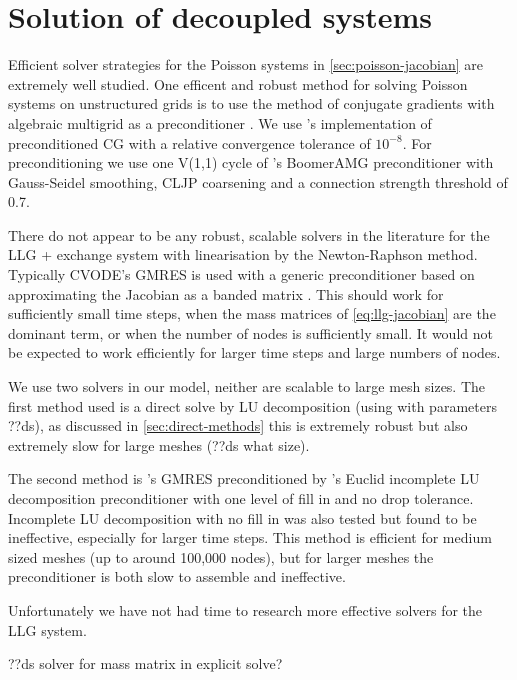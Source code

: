 \section{Solution of decoupled systems}
\label{sec:llg-only-system}

Efficient solver strategies for the Poisson systems in \cref{sec:poisson-jacobian} are extremely well studied.
One efficent and robust method for solving Poisson systems on unstructured grids is to use the method of conjugate gradients with algebraic multigrid as a preconditioner \cite[Chap. 2]{HowardElmanDavidSilvester2006}.
We use \oomph's implementation of preconditioned CG with a relative convergence tolerance of $10^{-8}$.
For preconditioning we use one V(1,1) cycle of \hypre's BoomerAMG preconditioner \cite{hypre} with Gauss-Seidel smoothing, CLJP coarsening and a connection strength threshold of 0.7.


There do not appear to be any robust, scalable solvers in the literature for the LLG + exchange system with linearisation by the Newton-Raphson method.
Typically CVODE's GMRES is used with a generic preconditioner based on approximating the Jacobian as a banded matrix \cite{nmag} \cite{Vasslios}.
This should work for sufficiently small time steps, \ie when the mass matrices of \cref{eq:llg-jacobian} are the dominant term, or when the number of nodes is sufficiently small.
It would not be expected to work efficiently for larger time steps and large numbers of nodes.

We use two solvers in our model, neither are scalable to large mesh sizes.
The first method used is a direct solve by LU decomposition (using \superlu \cite{superlu} with parameters ??ds), as discussed in \cref{sec:direct-methods} this is extremely robust but also extremely slow for large meshes (??ds what size).

The second method is \oomph's GMRES preconditioned by \hypre's Euclid incomplete LU decomposition preconditioner with one level of fill in and no drop tolerance.
Incomplete LU decomposition with no fill in was also tested but found to be ineffective, especially for larger time steps.
This method is efficient for medium sized meshes (up to around 100,000 nodes), but for larger meshes the preconditioner is both slow to assemble and ineffective.

Unfortunately we have not had time to research more effective solvers for the LLG system.


??ds solver for mass matrix in explicit solve?


